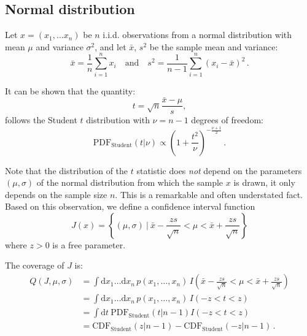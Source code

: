 \documentclass[11pt]{article}
\newcommand{\dd}{\mathrm{d}}
\begin{document}
\subsection{Normal distribution}

Let $x = (x_1,\ldots x_n)$ be  $n$ i.i.d. observations from a normal
distribution with mean $\mu$ and variance $\sigma^2$, and let $\bar{x}$, $s^2$
be the sample mean and variance:
\begin{equation}
    \bar{x} = \frac{1}{n} \sum_{i = 1}^{n} x_i \quad \mathrm{and} \quad
    s^2 = \frac{1}{n - 1} \sum_{i = 1}^{n} (x_i - \bar{x})^2\,.
\end{equation}

It can be shown that the quantity:
\begin{equation}
    t =\sqrt{n} \frac{\bar{x} - \mu}{s},
\end{equation}
follows the Student $t$ distribution with $\nu = n - 1$ degrees of freedom:
\begin{equation}
    \mathrm{PDF}_{\mathrm{Student}}(t|\nu) \propto 
    \left(1 + \frac{t^2}{\nu}\right)^{-\frac{\nu + 1}{2}}\,.
\end{equation}

Note that the distribution of the $t$ statistic does \emph{not} depend on the
parameters $(\mu, \sigma)$ of the normal distribution from which the sample $x$
is drawn, it only depends on the sample size $n$. This is a remarkable and
often understated fact. Based on this observation, we define a confidence
interval function
\begin{equation}
    J(x) = \left\{(\mu, \sigma)\ |\
    \bar{x} - \frac{z s}{\sqrt{n}} < \mu
    < \bar{x} + \frac{zs}{\sqrt{n}}\right\}
\end{equation}
where $z > 0$ is a free parameter.

The coverage of $J$ is:
\begin{align}
    Q(J, \mu, \sigma) 
    &= \int \dd x_1\ldots \dd x_n\, p(x_1,\ldots, x_n)\,
    I\left(\bar{x} - \frac{z s}{\sqrt{n}} < \mu 
        < \bar{x} + \frac{z s}{\sqrt{n}}\right)\\
    &= \int \dd x_1\ldots \dd x_n\, p(x_1,\ldots, x_n)\,
    I\left(-z < t < z\right)\\
    & = \int \dd t\ \mathrm{PDF}_{\mathrm{Student}}(t|n - 1) I(-z < t < z) \\
    & = \mathrm{CDF}_{\mathrm{Student}}(z|n - 1) - 
        \mathrm{CDF}_{\mathrm{Student}}(-z|n - 1)\,.
\end{align}
\end{document}
